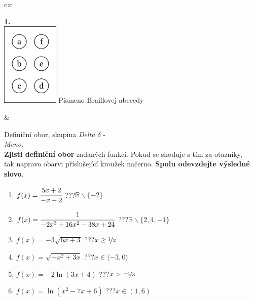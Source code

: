 \documentclass[10pt]{report}
\begin{document}
\begin{tabular}{c:c}
\begin{minipage}[c][99mm][t]{0.49\linewidth}
\begin{center}
\begin{minipage}{0.20\linewidth}
\begin{center}
{\Huge\bfseries 1.} \\[2mm]
\includegraphics[height=40mm]{../images/braille.png}
{\small Písmeno Braillovej abecedy}
\end{center}
\end{minipage}
\end{center}
\end{minipage}
&
\begin{minipage}[c][99mm][t]{0.49\linewidth}
\begin{center}
\vspace{7mm}
{\huge Definiční obor, skupina \textit{Delta $\delta$} -}\\[4.5mm]
\textit{Meno:}\phantom{xxxxxxxxxxxxxxxxxxxxxxxxxxxxxxxxxxxxxxxxxxxxxxxxxxxxxxxxxxxxxxxxx}\\[3.5mm]
\textbf{Zjisti definiční obor} zadaných funkcí. Pokud se shoduje s tím za otazníky,\\tak napravo obarvi příslušející kroužek načerno. \textbf{Spolu odevzdejte výsledné slovo}.\\[3mm]
\begin{minipage}{0.77\linewidth}
\begin{center}
\begin{varwidth}{\textwidth}
\begin{enumerate}
\normalsize
\item $f(x)=\cfrac{5x+2}{-x-2}$\quad \dotfill\; ???\;\dotfill \quad $\mathbb{R}\smallsetminus\{-2\}$
\item $f(x)=\cfrac{1}{-2x^3+16x^2-38x+24}$\quad \dotfill\; ???\;\dotfill \quad $\mathbb{R}\smallsetminus\{2,4,-1\}$
\item $f(x)=-3\sqrt{6x+3}$\quad \dotfill\; ???\;\dotfill \quad $x\geq\nicefrac{1}{2}$
\item $f(x)=\sqrt{-x^2+3x}$\quad \dotfill\; ???\;\dotfill \quad $x\in\langle-3 , 0\rangle$
\item $f(x)=-2\ln{(3x+4)}$\quad \dotfill\; ???\;\dotfill \quad $x>\nicefrac{-4}{3}$
\item $f(x)=\ln{(x^2-7x+6)}$\quad \dotfill\; ???\;\dotfill \quad $x\in(1 , 6)$

\end{enumerate}
\end{varwidth}
\end{center}
\end{minipage}
\end{center}
\end{minipage}
\end{tabular}
\end{document}
